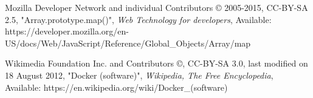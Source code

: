 \begin{thebibliography}{999}
\raggedright
Mozilla Developer Network and individual Contributors © 2005-2015, CC-BY-SA 2.5, "Array.prototype.map()",
{\em Web Technology for developers},
Available: https://developer.mozilla.org/en-US/docs/Web/JavaScript/Reference/Global\_Objects/Array/map

\raggedright
Wikimedia Foundation Inc. and Contributors ©, CC-BY-SA 3.0,
last modified on 18 August 2012, "Docker (software)",
{\em Wikipedia, The Free Encyclopedia},
Available: https://en.wikipedia.org/wiki/Docker\_(software)

\end{thebibliography}
